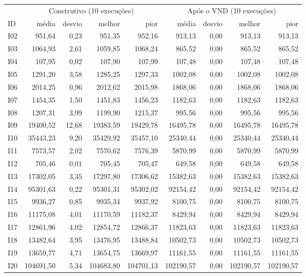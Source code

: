 \begin{tabular}{lrrrrrrrr}
\hline
 & \multicolumn{4}{c}{Construtivo (10 execuções)} & \multicolumn{4}{c}{Após o VND (10 execuções)} \\
ID & média & desvio & melhor & pior & média & desvio & melhor & pior \\
\hline
I02 & 951,64 & 0,23 & 951,35 & 952,16 & 913,13 & 0,00 & 913,13 & 913,13 \\
I03 & 1064,93 & 2,61 & 1059,85 & 1068,24 & 865,52 & 0,00 & 865,52 & 865,52 \\
I04 & 107,95 & 0,02 & 107,90 & 107,99 & 107,48 & 0,00 & 107,48 & 107,48 \\
I05 & 1291,20 & 3,58 & 1285,25 & 1297,33 & 1002,08 & 0,00 & 1002,08 & 1002,08 \\
I06 & 2014,25 & 0,96 & 2012,62 & 2015,98 & 1868,06 & 0,00 & 1868,06 & 1868,06 \\
I07 & 1454,35 & 1,50 & 1451,83 & 1456,23 & 1182,63 & 0,00 & 1182,63 & 1182,63 \\
I08 & 1207,31 & 3,99 & 1199,90 & 1215,37 & 995,56 & 0,00 & 995,56 & 995,56 \\
I09 & 19400,52 & 12,68 & 19383,59 & 19429,78 & 16495,78 & 0,00 & 16495,78 & 16495,78 \\
I10 & 35443,23 & 9,20 & 35429,92 & 35457,10 & 25340,44 & 0,00 & 25340,44 & 25340,44 \\
I11 & 7573,57 & 2,02 & 7570,62 & 7576,39 & 5870,99 & 0,00 & 5870,99 & 5870,99 \\
I12 & 705,46 & 0,01 & 705,45 & 705,47 & 649,58 & 0,00 & 649,58 & 649,58 \\
I13 & 17302,05 & 3,35 & 17297,80 & 17306,62 & 15382,63 & 0,00 & 15382,63 & 15382,63 \\
I14 & 95301,63 & 0,22 & 95301,31 & 95302,02 & 92154,42 & 0,00 & 92154,42 & 92154,42 \\
I15 & 9936,27 & 0,85 & 9935,34 & 9937,92 & 8100,75 & 0,00 & 8100,75 & 8100,75 \\
I16 & 11175,08 & 4,01 & 11170,59 & 11182,37 & 8429,94 & 0,00 & 8429,94 & 8429,94 \\
I17 & 12861,96 & 4,02 & 12854,72 & 12866,37 & 11823,63 & 0,00 & 11823,63 & 11823,63 \\
I18 & 13482,64 & 3,95 & 13476,95 & 13488,84 & 10502,73 & 0,00 & 10502,73 & 10502,73 \\
I19 & 13659,77 & 4,71 & 13654,75 & 13669,97 & 11161,55 & 0,00 & 11161,55 & 11161,55 \\
I20 & 104691,50 & 5,34 & 104683,80 & 104701,13 & 102190,57 & 0,00 & 102190,57 & 102190,57 \\

\end{tabular}
